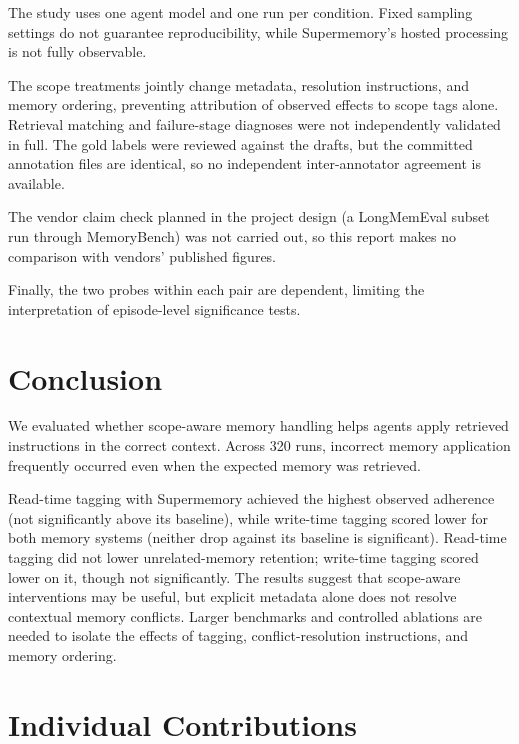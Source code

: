 \documentclass[11pt,a4paper]{article}
\begin{document}
The study uses one agent model and one run per
condition. Fixed sampling settings do not
guarantee reproducibility, while Supermemory's
hosted processing is not fully observable.

The scope treatments jointly change metadata,
resolution instructions, and memory ordering,
preventing attribution of observed effects to
scope tags alone. Retrieval matching and
failure-stage diagnoses were not independently
validated in full. The gold labels were reviewed
against the drafts, but the committed annotation
files are identical, so no independent
inter-annotator agreement is available.

The vendor claim check planned in the project
design (a LongMemEval subset run through
MemoryBench) was not carried out, so this report
makes no comparison with vendors' published
figures.

Finally, the two probes within each pair are
dependent, limiting the interpretation of
episode-level significance tests.

\section{Conclusion}

We evaluated whether scope-aware memory handling
helps agents apply retrieved instructions in
the correct context. Across 320 runs, incorrect
memory application frequently occurred even when
the expected memory was retrieved.

Read-time tagging with Supermemory achieved the
highest observed adherence (not significantly above
its baseline), while write-time tagging scored lower
for both memory systems (neither drop against its baseline is
significant). Read-time tagging did not
lower unrelated-memory retention; write-time tagging
scored lower on it, though not significantly. The results
suggest that scope-aware interventions may be useful,
but explicit metadata alone does not resolve
contextual memory conflicts. Larger benchmarks and
controlled ablations are needed to isolate
the effects of tagging, conflict-resolution
instructions, and memory ordering.

\section*{Individual Contributions}
\end{document}
